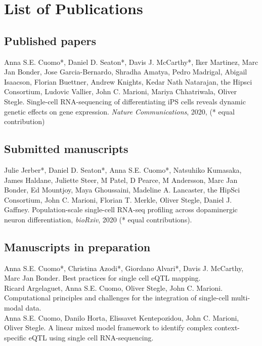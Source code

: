 \chapter{List of Publications}

\section{Published papers}

Anna S.E. Cuomo*, Daniel D. Seaton*, Davis J. McCarthy*, Iker Martinez, Marc Jan Bonder, Jose Garcia-Bernardo, Shradha Amatya, Pedro Madrigal, Abigail Isaacson, Florian Buettner, Andrew Knights, Kedar Nath Natarajan, the Hipsci Consortium, Ludovic Vallier, John C. Marioni, Mariya Chhatriwala, Oliver Stegle. 
Single-cell RNA-sequencing of differentiating iPS cells reveals dynamic genetic effects on gene expression. \textit{Nature Communications}, 2020, (* equal contribution)

\section{Submitted manuscripts}

Julie Jerber*, Daniel D. Seaton*, Anna S.E. Cuomo*, Natsuhiko Kumasaka, James Haldane, Juliette Steer, M Patel, D Pearce, M Andersson, Marc Jan Bonder, Ed Mountjoy, Maya Ghoussaini, Madeline A. Lancaster, the HipSci Consortium, John C. Marioni, Florian T. Merkle, Oliver Stegle, Daniel J. Gaffney.
Population-scale single-cell RNA-seq profiling across dopaminergic neuron differentiation, \textit{bioRxiv}, 2020 (* equal contributions).

\section{Manuscripts in preparation}

Anna S.E. Cuomo*, Christina Azodi*, Giordano Alvari*, Davis J. McCarthy, Marc Jan Bonder.  
Best practices for single cell eQTL mapping. \\

Ricard Argelaguet, Anna S.E. Cuomo, Oliver Stegle, John C. Marioni. 
Computational principles and challenges for the integration of single-cell multi-modal data. \\

Anna S.E. Cuomo, Danilo Horta, Elissavet Kentepozidou, John C. Marioni, Oliver Stegle.
A linear mixed model framework to identify complex context-specific eQTL using single cell RNA-sequencing.

